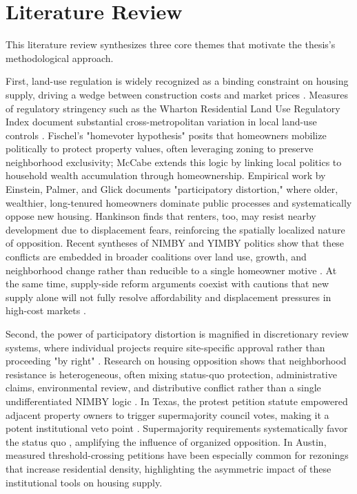 \documentclass[11pt, letterpaper, oneside]{article}
\begin{document}
\section{Literature Review}

This literature review synthesizes three core themes that motivate the thesis's methodological approach.

First, land-use regulation is widely recognized as a binding constraint on housing supply, driving a wedge between construction costs and market prices \cite{glaeser2005manhattan, glaeser2003zoning, gyourko2015regulation,quigley2005effects}. Measures of regulatory stringency such as the Wharton Residential Land Use Regulatory Index document substantial cross-metropolitan variation in local land-use controls \cite{gyourko2008wrluri,gyourko2021local}. Fischel's "homevoter hypothesis" \cite{fischel2001homevoter} posits that homeowners mobilize politically to protect property values, often leveraging zoning to preserve neighborhood exclusivity; McCabe \cite{mccabe2016} extends this logic by linking local politics to household wealth accumulation through homeownership. Empirical work by Einstein, Palmer, and Glick \cite{einstein2019book} documents "participatory distortion," where older, wealthier, long-tenured homeowners dominate public processes and systematically oppose new housing. Hankinson \cite{hankinson2018} finds that renters, too, may resist nearby development due to displacement fears, reinforcing the spatially localized nature of opposition. Recent syntheses of NIMBY and YIMBY politics show that these conflicts are embedded in broader coalitions over land use, growth, and neighborhood change rather than reducible to a single homeowner motive \cite{brouwer2024nimbys}. At the same time, supply-side reform arguments coexist with cautions that new supply alone will not fully resolve affordability and displacement pressures in high-cost markets \cite{hamilton2023reform,been2019supply}.

Second, the power of participatory distortion is magnified in discretionary review systems, where individual projects require site-specific approval rather than proceeding "by right" \cite{manville2016unpermitted, hills2011zoning}. Research on housing opposition shows that neighborhood resistance is heterogeneous, often mixing status-quo protection, administrative claims, environmental review, and distributive conflict rather than a single undifferentiated NIMBY logic \cite{pendall1999opposition,schively2007nimby}. In Texas, the protest petition statute empowered adjacent property owners to trigger supermajority council votes, making it a potent institutional veto point \cite{texas211006,furth2023invisible}. Supermajority requirements systematically favor the status quo \cite{cellini2010schools}, amplifying the influence of organized opposition. In Austin, measured threshold-crossing petitions have been especially common for rezonings that increase residential density, highlighting the asymmetric impact of these institutional tools on housing supply.
\end{document}
